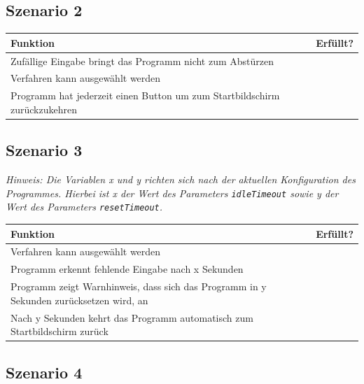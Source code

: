 \documentclass{article}
\newcommand{\cmark}{\ding{51}}
\begin{document}
  \subsection{Szenario 2}
    \begin{table}[H]
      \begin{tabularx}{\textwidth}{| >{\raggedright\arraybackslash}X | c |}
        \hline
        \textbf{Funktion} & \textbf{Erfüllt?} \\
        \hline
        Zufällige Eingabe bringt das Programm nicht zum Abstürzen & \cmark \\
        \hline
        Verfahren kann ausgewählt werden & \cmark \\
        \hline
        Programm hat jederzeit einen Button um zum Startbildschirm zurückzukehren & \cmark \\
        \hline
      \end{tabularx}
    \end{table}

  \subsection{Szenario 3}
    \textit{Hinweis: Die Variablen x und y richten sich nach der aktuellen Konfiguration des Programmes. Hierbei
      ist x der Wert des Parameters \texttt{idleTimeout} sowie y der Wert des Parameters \texttt{resetTimeout}.}
    \newline

    \begin{table}[H]
      \begin{tabularx}{\textwidth}{| >{\raggedright\arraybackslash}X | c |}
        \hline
        \textbf{Funktion} & \textbf{Erfüllt?} \\
        \hline
        Verfahren kann ausgewählt werden & \cmark \\
        \hline
        Programm erkennt fehlende Eingabe nach x Sekunden & \cmark \\
        \hline
        Programm zeigt Warnhinweis, dass sich das Programm in y Sekunden zurücksetzen wird, an & \cmark \\
        \hline
        Nach y Sekunden kehrt das Programm automatisch zum Startbildschirm zurück & \cmark \\
        \hline
      \end{tabularx}
    \end{table}

  \subsection{Szenario 4}
\end{document}
